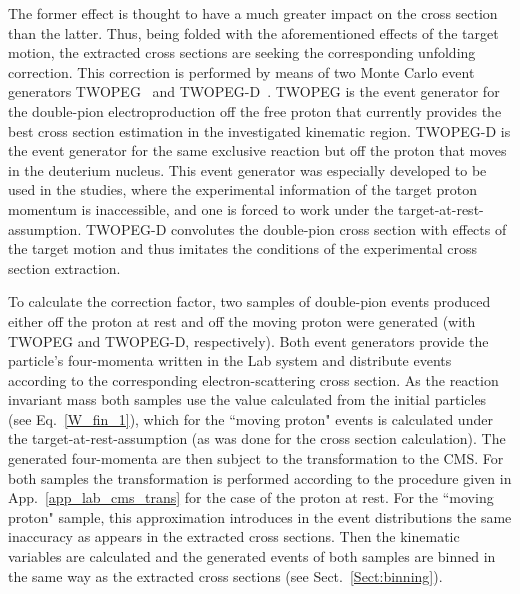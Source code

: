 The former effect is thought to have a much greater impact on the cross section than the latter. Thus, being folded with the aforementioned effects of the target motion, the extracted cross sections are seeking the corresponding unfolding correction. This correction is performed by means of two Monte Carlo event generators TWOPEG~\cite{twopeg} and TWOPEG-D~\cite{twopeg-d}. TWOPEG is the event generator for the double-pion electroproduction off the free proton that currently provides the best cross section estimation in the investigated kinematic region. TWOPEG-D is the event generator for the same exclusive reaction but off the proton that moves in the deuterium nucleus. This event generator was especially developed to be used in the studies, where the experimental information of the target proton momentum is inaccessible, and one is forced to work under the target-at-rest-assumption. TWOPEG-D convolutes the double-pion cross section with effects of the target motion and thus imitates the conditions of the experimental cross section extraction.

To calculate the correction factor, two samples of double-pion events produced either off the proton at rest and off the moving proton were generated (with TWOPEG and TWOPEG-D, respectively). Both event generators provide the particle's four-momenta written in the Lab system and distribute events according to the corresponding electron-scattering cross section. As the reaction invariant mass both samples use the value calculated from the initial particles (see Eq.~\eqref{W_fin_1}), which for the ``moving proton" events is calculated under the target-at-rest-assumption (as was done for the cross section calculation). The generated four-momenta are then subject to the transformation to the CMS. For both samples the transformation is performed according to the procedure given in App.~\ref{app_lab_cms_trans} for the case of the proton at rest. For the ``moving proton" sample, this approximation introduces in the event distributions the same inaccuracy as appears in the extracted cross sections. Then the kinematic variables are calculated and the generated events of both samples are binned in the same way as the extracted cross sections (see Sect.~\ref{Sect:binning}). 


